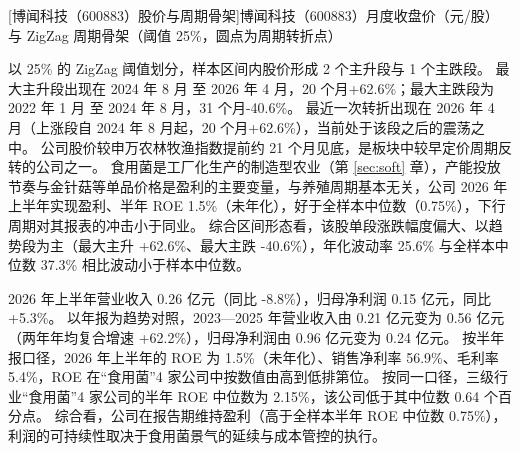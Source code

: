 \begin{center}
\begin{minipage}{\textwidth}\centering
{}

[博闻科技（600883）股价与周期骨架]{博闻科技（600883）月度收盘价（元/股）与 ZigZag 周期骨架（阈值 25\%，圆点为周期转折点）}
\end{minipage}
\end{center}

 以 25\% 的 ZigZag 阈值划分，样本区间内股价形成 2 个主升段与 1 个主跌段。 最大主升段出现在 2024 年 8 月 至 2026 年 4 月，20 个月+62.6\%；最大主跌段为 2022 年 1 月 至 2024 年 8 月，31 个月-40.6\%。 最近一次转折出现在 2026 年 4 月（上涨段自 2024 年 8 月起，20 个月+62.6\%），当前处于该段之后的震荡之中。 公司股价较申万农林牧渔指数提前约 21 个月见底，是板块中较早定价周期反转的公司之一。 食用菌是工厂化生产的制造型农业（第 \ref{sec:soft} 章），产能投放节奏与金针菇等单品价格是盈利的主要变量，与养殖周期基本无关，公司 2026 年上半年实现盈利、半年 ROE 1.5\%（未年化），好于全样本中位数（0.75\%），下行周期对其报表的冲击小于同业。 综合区间形态看，该股单段涨跌幅度偏大、以趋势段为主（最大主升 +62.6\%、最大主跌 -40.6\%），年化波动率 25.6\% 与全样本中位数 37.3\% 相比波动小于样本中位数。

 2026 年上半年营业收入 0.26 亿元（同比 -8.8\%），归母净利润 0.15 亿元，同比 +5.3\%。 以年报为趋势对照，2023---2025 年营业收入由 0.21 亿元变为 0.56 亿元（两年年均复合增速 +62.2\%），归母净利润由 0.96 亿元变为 0.24 亿元。 按半年报口径，2026 年上半年的 ROE 为 1.5\%（未年化）、销售净利率 56.9\%、毛利率 5.4\%，ROE 在“食用菌”4 家公司中按数值由高到低排第位。 按同一口径，三级行业“食用菌”4 家公司的半年 ROE 中位数为 2.15\%，该公司低于其中位数 0.64 个百分点。 综合看，公司在报告期维持盈利（高于全样本半年 ROE 中位数 0.75\%），利润的可持续性取决于食用菌景气的延续与成本管控的执行。

